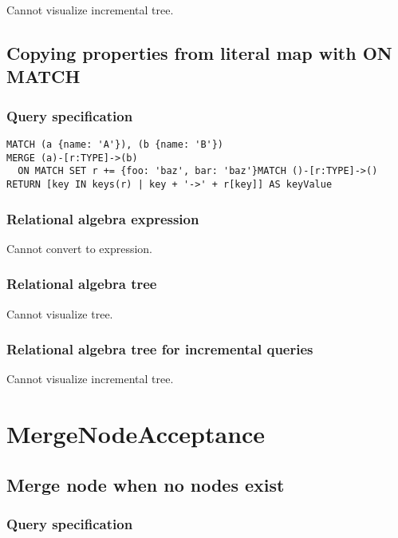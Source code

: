 Cannot visualize incremental tree.

\subsection{Copying properties from literal map with ON MATCH}

\subsubsection*{Query specification}

\begin{lstlisting}
MATCH (a {name: 'A'}), (b {name: 'B'})
MERGE (a)-[r:TYPE]->(b)
  ON MATCH SET r += {foo: 'baz', bar: 'baz'}MATCH ()-[r:TYPE]->()
RETURN [key IN keys(r) | key + '->' + r[key]] AS keyValue
\end{lstlisting}

\subsubsection*{Relational algebra expression}

Cannot convert to expression.

\subsubsection*{Relational algebra tree}

Cannot visualize tree.

\subsubsection*{Relational algebra tree for incremental queries}

Cannot visualize incremental tree.

\section{MergeNodeAcceptance}

\subsection{Merge node when no nodes exist}

\subsubsection*{Query specification}

